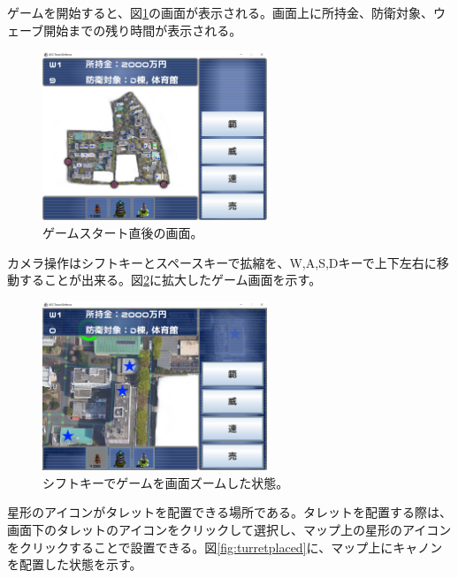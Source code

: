 \documentclass[11pt,a4j]{jarticle}
\begin{document}
ゲームを開始すると、図\ref{fig:initscreen}の画面が表示される。画面上に所持金、防衛対象、ウェーブ開始までの残り時間が表示される。

\begin{figure}[H]
    \begin{center}
        \leavevmode
        \includegraphics[width=0.6\textwidth]{initscreen.png}
        \caption{ゲームスタート直後の画面。}
        \label{fig:initscreen}
    \end{center}
\end{figure}

カメラ操作はシフトキーとスペースキーで拡縮を、W,A,S,Dキーで上下左右に移動することが出来る。図\ref{fig:zoomedscreen}に拡大したゲーム画面を示す。

\begin{figure}[H]
    \begin{center}
        \leavevmode
        \includegraphics[width=0.6\textwidth]{zoomedscreen.png}
        \caption{シフトキーでゲームを画面ズームした状態。}
        \label{fig:zoomedscreen}
    \end{center}
\end{figure}

星形のアイコンがタレットを配置できる場所である。タレットを配置する際は、画面下のタレットのアイコンをクリックして選択し、マップ上の星形のアイコンをクリックすることで設置できる。図\ref{fig:turretplaced}に、マップ上にキャノンを配置した状態を示す。
\end{document}
